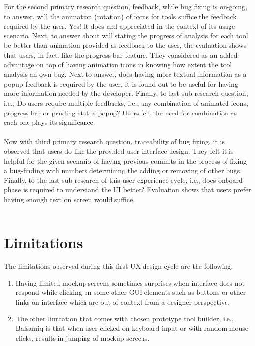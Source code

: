 For the second primary research question, feedback, while bug fixing is on-going, to answer, will the animation (rotation) of icons for tools suffice the feedback required by the user. Yes! It does and appreciated in the context of its usage scenario. Next, to answer about will stating the progress of analysis for each tool be better than animation provided as feedback to the user, the evaluation shows that users, in fact, like the progress bar feature.  They considered as an added advantage on top of having animation icons in knowing how extent the tool analysis an own bug. Next to answer, does having more textual information as a popup feedback is required by the user, it is found out to be useful for having more information needed by the developer. Finally, to last sub research question, i.e., Do users require multiple feedbacks, i.e., any combination of animated icons, progress bar or pending status popup? Users felt the need for combination as each one plays its significance. \\ \\

Now with third primary research question, traceability of bug fixing, it is observed that users do like the provided user interface design. They felt it is helpful for the given scenario of having previous commits in the process of fixing a bug-finding with numbers determining the adding or removing of other bugs.
Finally, to the last sub research of this user experience cycle, i.e., does onboard phase is required to understand the UI better? Evaluation shows that users prefer having enough text on screen would suffice. \\ \\

\section{Limitations}

The limitations observed during this first UX design cycle are the following. \\

\begin{enumerate}
\item Having limited mockup screens sometimes surprises when interface does not respond while clicking on some other GUI elements such as buttons or other links on interface which are out of context from a designer perspective.
\item The other limitation that comes with chosen prototype tool builder, i.e., Balsamiq is that when user clicked on keyboard input or with random mouse clicks, results in jumping of mockup screens.  \\ \\
\end{enumerate}

\let\cleardoublepage\clearpage
